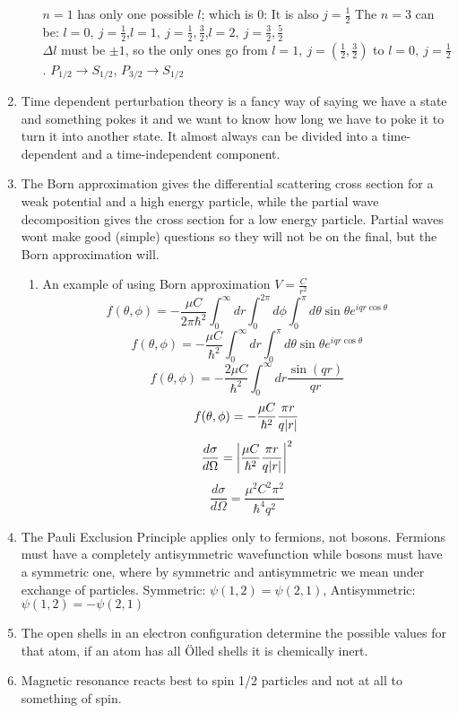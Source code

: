 \documentclass[english]{article}
\begin{document}
\begin{enumerate}
\begin{enumerate}
$n = 1$ has only one possible $l$; which is $0$: It is also $j =\frac{1}{2}$ The $n = 3$ can  be: $l=0,\ j=\frac{1}{2}$,$l=1,\ j=\frac{1}{2},\frac{3}{2}$,$l=2,\ j=\frac{3}{2},\frac{5}{2}$\\
$\Delta l$ must be $\pm 1$, so the only ones go from $l=1,\ j=(\frac{1}{2},\frac{3}{2})$ to $l=0,\ j=\frac{1}{2}$. $P_{1/2}\rightarrow S_{1/2}$, $P_{3/2}\rightarrow S_{1/2}$
\end{enumerate}
\item  Time dependent perturbation theory is a fancy way of saying we have a state and something pokes it and we want to know how long we have to poke it to turn it into another state. It almost always can be divided into a time-dependent and a time-independent component.
\item  The Born approximation gives the differential scattering cross section for a weak potential and a high energy particle, while the partial wave decomposition gives the cross section for a low energy particle. Partial waves wont make good (simple) questions so they will not be on the final, but the Born approximation will.
\begin{enumerate}
\item An example of using Born approximation $V=\frac{C}{r^2}$
$$f(\theta,\phi)=-\frac{\mu C}{2\pi\hbar^2}\int_0^{\infty}dr\int_0^{2\pi}d\phi\int_0^{\pi} d\theta\sin\theta e^{iqr\cos\theta}$$
$$f(\theta,\phi)=-\frac{\mu C}{\hbar^2}\int_0^{\infty}dr\int_0^{\pi} d\theta\sin\theta e^{iqr\cos\theta}$$
$$f(\theta,\phi)=-\frac{2\mu C}{\hbar^2}\int_0^{\infty}dr\frac{\sin(qr)}{qr}$$
$$f(\theta,\phi)=-\frac{\mu C}{\hbar^2}\frac{\pi r}{q\abs{r}}$$
$$\frac{d\sigma}{d\Omega}=\left|\frac{\mu C}{\hbar^2}\frac{\pi r}{q\abs{r}}\right|^2$$
$$\frac{d\sigma}{d\Omega}=\frac{\mu^2 C^2\pi^2}{\hbar^4q^2}$$
\end{enumerate}
\item  The Pauli Exclusion Principle applies only to fermions, not bosons. Fermions must have a completely antisymmetric wavefunction while bosons must have a symmetric one, where by symmetric and antisymmetric we mean under exchange of particles. Symmetric: $\psi(1, 2) = \psi(2,1)$, Antisymmetric: $\psi(1,2) =
 -\psi(2, 1)$
\item The open shells in an electron configuration determine the possible values for that atom, if an atom has all Ölled shells it is chemically inert.
\item Magnetic resonance reacts best to spin 1/2 particles and not at all to something of spin.
\end{enumerate}
\end{document}
